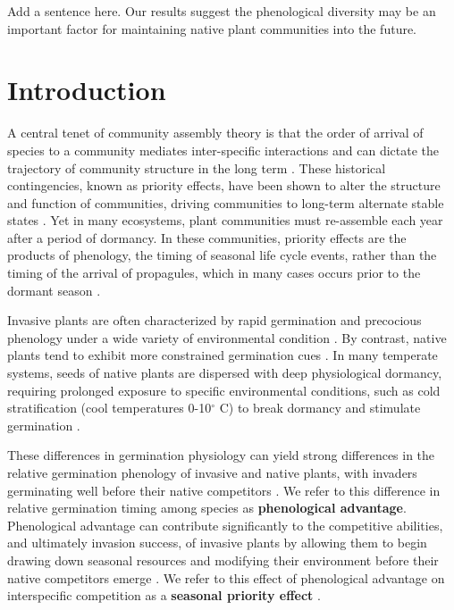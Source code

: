 \documentclass{article}[11pt]
\begin{document}
Add a sentence here. Our results suggest the phenological diversity may be an important factor for maintaining native plant communities into the future. %


\section*{Introduction}
 A central tenet of community assembly theory is that the order of arrival of species to a community mediates inter-specific interactions and can dictate the trajectory of community structure in the long term \citep{Fukami2015}. These historical contingencies, known as priority effects, have been shown to alter the structure and function of communities, driving communities to long-term alternate stable states \citep{Fukami2011}. Yet in many ecosystems, plant communities must re-assemble each year after a period of dormancy. In these communities, priority effects are the products of phenology, the timing of seasonal life cycle events,%
rather than the timing of the arrival of propagules, which in many cases occurs prior to the dormant season \citep{Rudolf:2019aa,Howe:1982aa,Baskin:1988aa}. 

Invasive plants are often characterized by rapid germination and precocious phenology under a wide variety of environmental condition \citep{Gioria2018,Gioria:2017wo,Wolkovich:2011uh,Smith:2013uj}. By contrast, native plants tend to exhibit more constrained germination cues \citep{Marushia:2010ug}. In many temperate systems, seeds of native plants are dispersed with deep physiological dormancy, requiring prolonged exposure to specific environmental conditions, such as cold stratification (cool temperatures 0-10$^{\circ}$ C) to break dormancy and stimulate germination \citep{Brink:2013wr,Cavieres:2017aa,Bradford:2007tj}.

These differences in germination physiology can yield strong differences in the relative germination phenology of invasive and native plants, with invaders germinating well before their native competitors \citep{Gioria:2017wo}. We refer to this difference in relative germination timing among species as \textbf{phenological advantage}. Phenological advantage can contribute significantly to the competitive abilities, and ultimately invasion success, of invasive plants by allowing them to begin drawing down seasonal resources and modifying their environment before their native competitors emerge \citep{Kardol2013}. We refer to this effect of phenological advantage on interspecific competition as a \textbf{seasonal priority effect} \citep{Wainwright_2011}.
\end{document}
